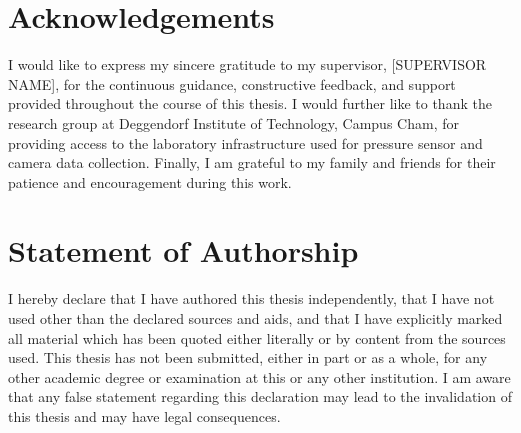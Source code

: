 \documentclass[11pt,a4paper]{report}
\begin{document}

\chapter*{Acknowledgements}
I would like to express my sincere gratitude to my supervisor, [SUPERVISOR NAME],
for the continuous guidance, constructive feedback, and support provided
throughout the course of this thesis. I would further like to thank the
research group at Deggendorf Institute of Technology, Campus Cham, for
providing access to the laboratory infrastructure used for pressure sensor
and camera data collection. Finally, I am grateful to my family and friends
for their patience and encouragement during this work.
\newpage

\chapter*{Statement of Authorship}
I hereby declare that I have authored this thesis independently, that I
have not used other than the declared sources and aids, and that I have
explicitly marked all material which has been quoted either literally or
by content from the sources used. This thesis has not been submitted,
either in part or as a whole, for any other academic degree or examination
at this or any other institution. I am aware that any false statement
regarding this declaration may lead to the invalidation of this thesis
and may have legal consequences.
\end{document}
